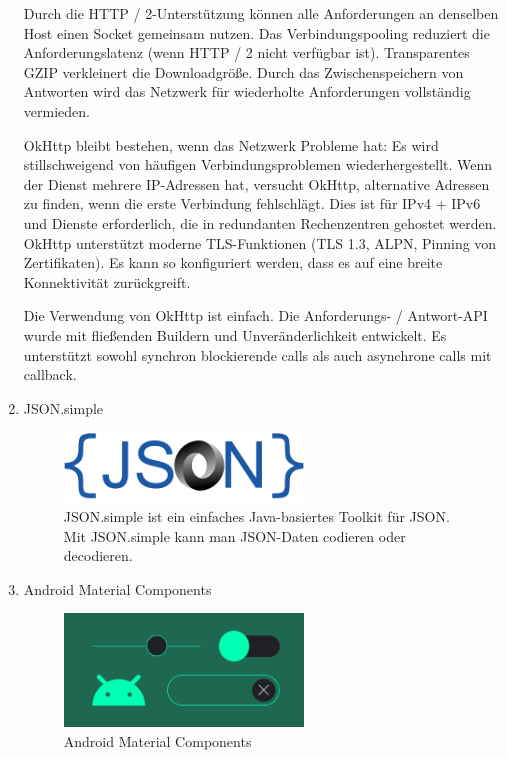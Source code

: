 \documentclass[10pt]{scrartcl}
\begin{document}
\begin{enumerate}
Durch die HTTP / 2-Unterstützung können alle Anforderungen an denselben Host einen Socket gemeinsam nutzen.
Das Verbindungspooling reduziert die Anforderungslatenz (wenn HTTP / 2 nicht verfügbar ist).
Transparentes GZIP verkleinert die Downloadgröße.
Durch das Zwischenspeichern von Antworten wird das Netzwerk für wiederholte Anforderungen vollständig vermieden.

OkHttp bleibt bestehen, wenn das Netzwerk Probleme hat: Es wird stillschweigend von häufigen Verbindungsproblemen wiederhergestellt. Wenn der Dienst mehrere IP-Adressen hat, versucht OkHttp, alternative Adressen zu finden, wenn die erste Verbindung fehlschlägt. Dies ist für IPv4 + IPv6 und Dienste erforderlich, die in redundanten Rechenzentren gehostet werden. OkHttp unterstützt moderne TLS-Funktionen (TLS 1.3, ALPN, Pinning von Zertifikaten). Es kann so konfiguriert werden, dass es auf eine breite Konnektivität zurückgreift.

Die Verwendung von OkHttp ist einfach. Die Anforderungs- / Antwort-API wurde mit fließenden Buildern und Unveränderlichkeit entwickelt. Es unterstützt sowohl synchron blockierende calls als auch asynchrone calls mit callback.


	\item
	JSON.simple
	
\begin{figure}[H]
	\centering
	\includegraphics[width=0.6\textwidth]{Bilder/BibliothekenLogos/JSONLogo.png}
	\caption{JSON.simple ist ein einfaches Java-basiertes Toolkit für JSON. Mit JSON.simple kann man JSON-Daten codieren oder decodieren.}
\end{figure}

	
	\item
	Android Material Components
	
\begin{figure}[H]
	\centering
	\includegraphics[width=0.6\textwidth]{Bilder/BibliothekenLogos/AndroidMaterialComponenLogo.png}
	\caption{Android Material Components}
\end{figure}



\end{enumerate}
\end{document}
